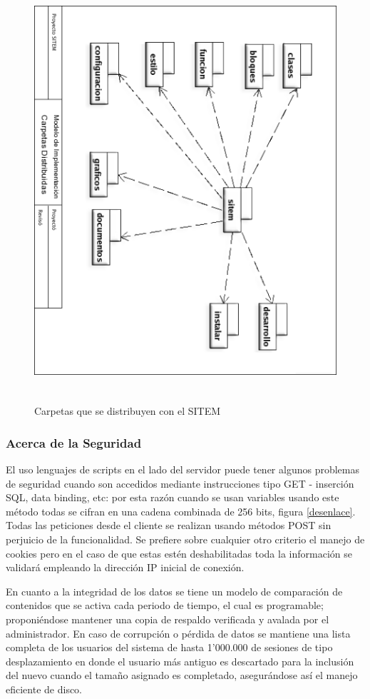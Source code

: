 \begin{figure}
 \centering
 \includegraphics[width=156mm, height=156mm]{carpetas.png}
 \caption{Carpetas que se distribuyen con el SITEM}
 \label{carpetas_sitem}
\end{figure}

\subsubsection{Acerca de la Seguridad}
El uso lenguajes de scripts en el lado del servidor puede tener algunos problemas de seguridad cuando son accedidos mediante instrucciones tipo GET - inserción SQL, data binding, etc: por esta razón cuando se usan variables usando este método todas se cifran en una cadena combinada de 256 bits, figura \ref{desenlace}. Todas las peticiones desde el cliente se realizan usando métodos POST sin perjuicio de la funcionalidad. Se prefiere sobre cualquier otro criterio el manejo de cookies pero en el caso de que estas estén deshabilitadas toda la información se validará empleando la dirección IP inicial de conexión.

En cuanto a la integridad de los datos se tiene un modelo de comparación de contenidos que se activa cada periodo de tiempo, el cual es programable; proponiéndose mantener una copia de respaldo verificada y avalada por el administrador. En caso de corrupción o pérdida de datos se mantiene una lista completa de los usuarios del sistema de hasta 1'000.000 de sesiones de tipo desplazamiento en donde el usuario más antiguo es descartado para la inclusión del nuevo cuando el tamaño asignado es completado, asegurándose así el manejo eficiente de disco.

